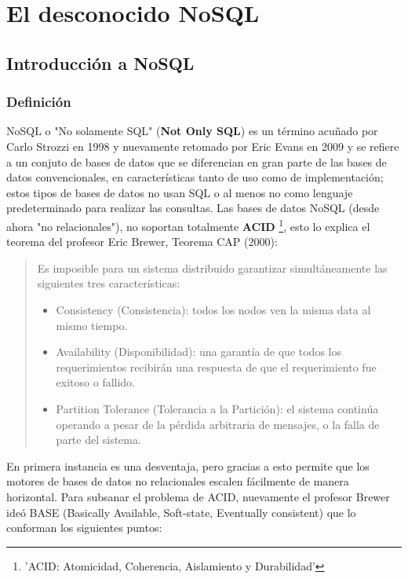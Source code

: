 \part{El desconocido NoSQL} 
\chapter{Introducci\'on a NoSQL}

\section{Definici\'on}

NoSQL o "No solamente SQL" ({\bf Not Only SQL}) es un t\'ermino acu\~nado por Carlo Strozzi en 1998 y nuevamente retomado por Eric Evans en 2009 y se refiere a un conjuto de bases de datos que se diferencian en gran parte de las bases de datos convencionales, en caracter\'isticas tanto de uso como de implementaci\'on; estos tipos de bases de datos no usan SQL o al menos no como lenguaje predeterminado para realizar las consultas. Las bases de datos NoSQL (desde ahora "no relacionales"), no soportan totalmente {\bf ACID} \footnote{'ACID: Atomicidad, Coherencia, Aislamiento y Durabilidad'}, esto lo explica el teorema del profesor Eric Brewer, Teorema CAP (2000):

\begin{quote}
Es imposible para un sistema distribuido garantizar simultáneamente las siguientes tres características:

	\begin{itemize}
		\item Consistency (Consistencia): todos los nodos ven la misma data al mismo tiempo.
		\item Availability (Disponibilidad): una garantía de que todos los requerimientos recibirán una respuesta de que el requerimiento fue exitoso o fallido.
		\item Partition Tolerance (Tolerancia a la Partición): el sistema continúa operando a pesar de la pérdida arbitraria de mensajes, o la falla de parte del sistema.
	\end{itemize}
\end{quote}

En primera instancia es una desventaja, pero gracias a esto permite que los motores de bases de datos no relacionales escalen f\'acilmente de manera horizontal. Para subsanar el problema de ACID, nuevamente el profesor Brewer ide\'o BASE (Basically Available, Soft-state, Eventually consistent) que lo conforman los siguientes puntos:

